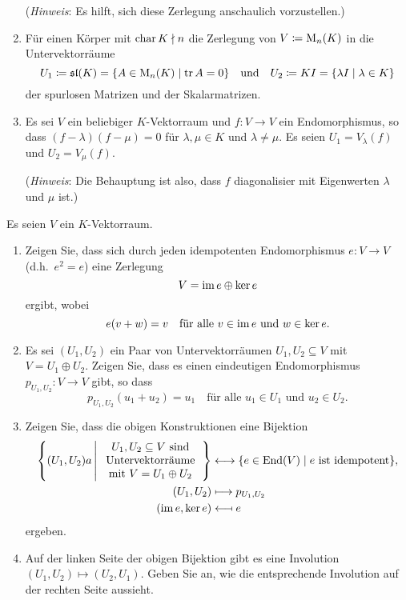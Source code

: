 \documentclass[a4paper,10pt]{scrartcl}
\begin{document}
\begin{question}
\begin{enumerate}[leftmargin=*]
      (\emph{Hinweis}:
       Es hilft, sich diese Zerlegung anschaulich vorzustellen.)
    \item
      Für einen Körper mit $\operatorname{char} K \nmid n$ die Zerlegung von $V \coloneqq \operatorname{M}_n(K)$ in die Untervektorräume
      \[
        U_1 \coloneqq \mathfrak{sl}(K) = \{ A \in \operatorname{M}_n(K) \mid \operatorname{tr} A  = 0 \}
        \quad\text{und}\quad
        U_2 \coloneqq K I = \{ \lambda I \mid \lambda \in K \}
      \]
      der spurlosen Matrizen und der Skalarmatrizen.
    \item
      Es sei $V$ ein beliebiger $K$-Vektorraum und $f \colon V \to V$ ein Endomorphismus, so dass $(f-\lambda)(f-\mu) = 0$ für $\lambda, \mu \in K$ und $\lambda \neq \mu$.
      Es seien $U_1 = V_\lambda(f)$ und $U_2 = V_\mu(f)$.
      
      (\emph{Hinweis}:
       Die Behauptung ist also, dass $f$ diagonalisier mit Eigenwerten $\lambda$ und $\mu$ ist.)
  \end{enumerate}
\end{question}


\begin{question}
  Es seien $V$ ein $K$-Vektorraum.
  \begin{enumerate}[leftmargin=*]
    \item
      Zeigen Sie, dass sich durch jeden idempotenten Endomorphismus $e \colon V \to V$ (d.h.\ $e^2 = e$) eine Zerlegung
      \[
        V = \operatorname{im} e \oplus \ker e
      \]
      ergibt, wobei
      \[
        e(v + w) = v
        \quad
        \text{für alle $v \in \operatorname{im} e$ und $w \in \ker e$}.
      \]
    \item
      Es sei $(U_1, U_2)$ ein Paar von Untervektorräumen $U_1, U_2 \subseteq V$ mit $V = U_1 \oplus U_2$.
      Zeigen Sie, dass es einen eindeutigen Endomorphismus $p_{U_1, U_2} \colon V \to V$ gibt, so dass
      \[
          p_{U_1, U_2}(u_1 + u_2)
        = u_1
        \quad
        \text{für alle $u_1 \in U_1$ und $u_2 \in U_2$}.
      \]
    \item
      Zeigen Sie, dass die obigen Konstruktionen eine Bijektion
      \begin{align*}
        \left\{
          (U_1, U_2)a
          \,\middle|\,
          \begin{tabular}{c}
            $U_1, U_2 \subseteq V$ sind \\
            Untervektorräume            \\
            mit $V = U_1 \oplus U_2$
          \end{tabular}
        \right\}
        &\longleftrightarrow
        \{ e \in \End(V) \mid \text{$e$ ist idempotent} \},
      \\
        (U_1, U_2) &\longmapsto p_{U_1, U_2}
      \\
        (\im e, \ker e) &\longmapsfrom e
      \end{align*}
      ergeben.
    \item
      Auf der linken Seite der obigen Bijektion gibt es eine Involution $(U_1, U_2) \mapsto (U_2, U_1)$.
      Geben Sie an, wie die entsprechende Involution auf der rechten Seite aussieht.
  \end{enumerate}
\end{question}
\end{document}
